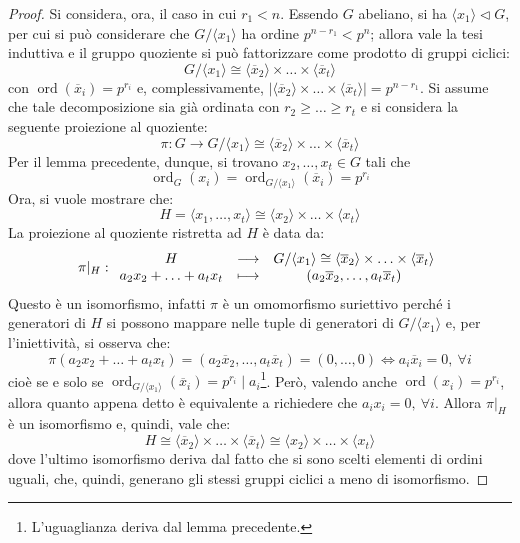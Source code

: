 \documentclass[11pt]{article}
\theoremstyle{style}
\numberwithin{equation}{subsection}
\begin{document}
\begin{proof}
		Si considera, ora, il caso in cui $r_1<n$.
		Essendo $G$ abeliano, si ha $\langle x_1 \rangle \lhd G$, per cui si pu\`o considerare che $G / \langle x_1 \rangle$ ha ordine $p^{n-r_1} < p^n$; allora vale la tesi induttiva e il gruppo quoziente si pu\`o fattorizzare come prodotto di gruppi ciclici:
		\[
		G / \langle x_1 \rangle \cong \langle \overline{x}_2 \rangle\times \ldots\times \langle \overline{x}_t \rangle
		\] 
		con $\operatorname{ord}(\overline{x}_i) = p^{r_i} $ e, complessivamente, $\lvert \langle \overline{x}_2 \rangle\times \ldots\times \langle \overline{x}_t \rangle \rvert=p^{n-r_1}  $.
		Si assume che tale decomposizione sia gi\`a ordinata con $r_2\ge \ldots\ge r_t$ e si considera la seguente proiezione al quoziente:
		\[
		\pi : G \to G / \langle x_1 \rangle \cong \langle \overline{x}_2 \rangle\times \ldots\times \langle \overline{x}_t \rangle
		\] 
		Per il lemma precedente, dunque, si trovano $x_2,\ldots,x_t \in G$ tali che 
		\[
		\operatorname{ord}_G(x_i) =\operatorname{ord}_{G/\langle x_1 \rangle} (\overline{x}_i) = p^{r_i} 
		\] 
		Ora, si vuole mostrare che:
\[
H = \langle x_1,\ldots,x_t \rangle\cong \langle x_2 \rangle\times \ldots\times \langle x_t \rangle
\] 
La proiezione al quoziente ristretta ad $H$ \`e data da:
\[
\pi|_{H}  : 
	\begin{array}
		{c c c}
		H &\longrightarrow& G / \langle x_1 \rangle\cong \langle \overline{x}_2 \rangle\times \ldots\times \langle \overline{x}_t \rangle\\
		a_2x_2+\ldots+a_tx_t&\longmapsto& (a_2\overline{x}_2,\ldots,a_t \overline{x}_t)
	\end{array}
\] 
Questo \`e un isomorfismo, infatti $\pi$ \`e un omomorfismo suriettivo perch\'e i generatori di $H$ si possono mappare nelle tuple  di generatori di $G / \langle x_1 \rangle$ e, per l'iniettivit\`a, si osserva che:
\[
\pi(a_2x_2+ \ldots+a_t x_t) = (a_2\overline{x}_2,\ldots,a_t \overline{x}_t)= (0,\ldots,0) \iff a_i \overline{x}_i = 0, \ \forall i
\] 
cio\`e se e solo se $\operatorname{ord}_{G/\langle x_1 \rangle} (\overline{x}_i) = p^{r_i}  \mid a_i $\footnote{L'uguaglianza deriva dal lemma precedente.}.
Per\`o, valendo anche $\operatorname{ord}(x_i) =p^{r_i} $, allora quanto appena detto \`e equivalente a richiedere che $a_i x_ i= 0 , \ \forall i$.
Allora $\pi|_{H} $ \`e un isomorfismo e, quindi, vale che:
\[
H \cong \langle \overline{x}_2 \rangle\times \ldots \times \langle \overline{x}_t \rangle \cong \langle x_2 \rangle\times \ldots\times \langle x_t \rangle
\] 
dove l'ultimo isomorfismo deriva dal fatto che si sono scelti elementi di ordini uguali, che, quindi, generano gli stessi gruppi ciclici a meno di isomorfismo.


\end{proof}
\end{document}
